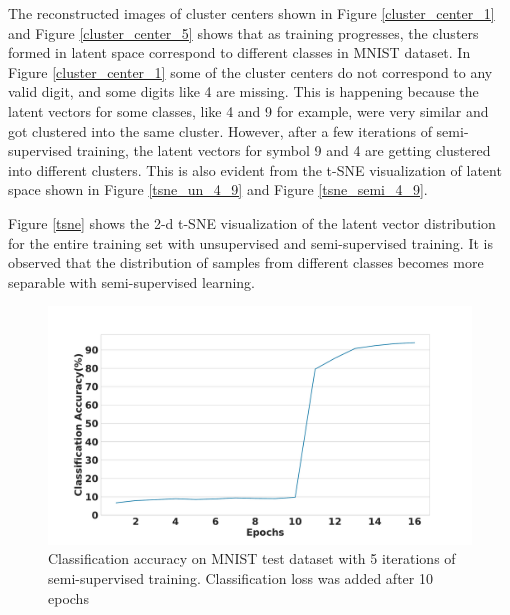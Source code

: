 \documentclass[runningheads]{llncs}
\begin{document}
The reconstructed images of cluster centers shown in Figure \ref{cluster_center_1} and Figure \ref{cluster_center_5} shows that as training progresses, the clusters formed in latent space correspond to different classes in MNIST dataset.
In Figure \ref{cluster_center_1} some of the cluster centers do not correspond to any valid digit, and some digits like 4  are missing.
This is happening because the latent vectors for some classes, like  4 and 9 for example,  were very similar and got clustered into the same cluster.
However, after a few iterations of semi-supervised training, the latent vectors for symbol 9 and 4 are getting clustered into different clusters.
This is also evident from the t-SNE visualization of latent space shown in Figure \ref{tsne_un_4_9} and Figure \ref{tsne_semi_4_9}.

Figure \ref{tsne} shows the 2-d t-SNE visualization of the latent vector distribution for the entire training set with unsupervised and semi-supervised training.
It is observed that the distribution of samples from different classes becomes more separable with semi-supervised learning.

\begin{figure}[!t]
\centering
  \centering
  \includegraphics[width=.5\linewidth]{images/classification_acc_semi_supervised}
\caption{Classification accuracy on MNIST test dataset with 5 iterations of semi-supervised training. Classification loss was added after 10 epochs}
\label{classificaion_acc}
\end{figure}


\end{document}
